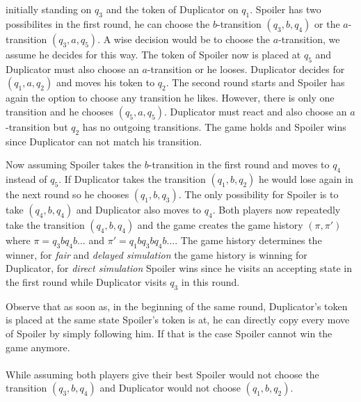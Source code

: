 \documentclass[12pt,oneside,bibliography=totoc,abstracton]{scrartcl}
\begin{document}
initially standing on $q_3$ and the token of Duplicator on $q_1$. Spoiler has two possibilites in the first round, he can choose the
$b$-transition $(q_3, b, q_4)$ or the $a$-transition $(q_3, a, q_5)$. A wise decision would be to choose the $a$-transition,
we assume he decides for this way. The token of Spoiler now is placed at $q_5$ and Duplicator must
also choose an $a$-transition or he looses. Duplicator decides for $(q_1, a, q_2)$ and moves his token to $q_2$.
The second round starts and Spoiler has again the option to choose any transition he likes.
However, there is only one transition and he chooses $(q_5, a, q_5)$. Duplicator must react and also choose an
$a$-transition but $q_2$ has no outgoing transitions. The game holds and Spoiler wins since Duplicator
can not match his transition.

Now assuming Spoiler takes the $b$-transition in the first round and moves to $q_4$ instead of $q_5$.
If Duplicator takes the transition $(q_1, b, q_2)$ he would lose again in the next round so he chooses $(q_1, b, q_3)$.
The only possibility for Spoiler is to take $(q_4, b, q_4)$ and Duplicator also moves to $q_4$. Both players now
repeatedly take the transition $(q_4, b, q_4)$ and the game creates the game history $(\pi, \pi')$
where $\pi = q_3bq_4b \ldots$ and $\pi' = q_1bq_3bq_4b \ldots$. The game history determines the winner,
for \textit{fair} and \textit{delayed simulation} the game history is winning for Duplicator, for \textit{direct simulation}
Spoiler wins since he visits an accepting state in the first round while Duplicator visits $q_3$ in this round.

Observe that as soon as, in the beginning of the same round, Duplicator's token is placed
at the same state Spoiler's token is at, he can directly copy every move of Spoiler by simply following him.
If that is the case Spoiler cannot win the game anymore.\\\\
While assuming both players give their best Spoiler would not choose the
transition $(q_3, b, q_4)$ and Duplicator would not choose $(q_1, b, q_2)$.

\end{document}
